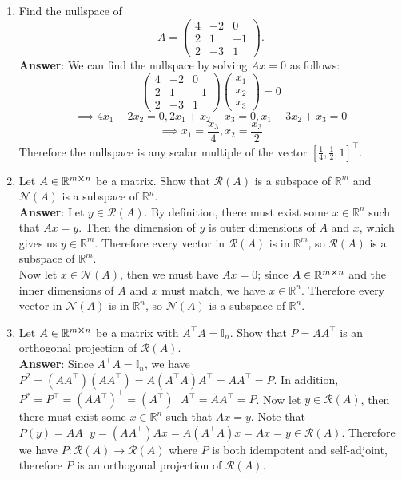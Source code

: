 \documentclass{article}
\begin{document}
\begin{enumerate}
    \item Find the nullspace of \[A=\begin{pmatrix}
                  4 & -2 & 0  \\
                  2 & 1  & -1 \\
                  2 & -3 & 1
              \end{pmatrix}.\]
          \textbf{Answer}: We can find the nullspace by solving $Ax=0$ as follows: \[\begin{pmatrix}
                  4 & -2 & 0  \\
                  2 & 1  & -1 \\
                  2 & -3 & 1
              \end{pmatrix}\begin{pmatrix}
                  x_1 \\x_2\\x_3
              \end{pmatrix}=0\]
          \[\implies 4x_1-2x_2=0, 2x_1+x_2-x_3=0, x_1-3x_2+x_3=0\]
          \[\implies x_1=\frac{x_3}{4}, x_2=\frac{x_3}{2}\]
          Therefore the nullspace is any scalar multiple of the vector $[\frac{1}{4},\frac{1}{2},1]^\top$.
    \item Let $A\in\mathbb{R}^{m\cross n}$ be a matrix. Show that $\mathcal{R}(A)$ is a subspace of $\mathbb{R}^m$ and $\mathcal{N}(A)$ is a subspace of $\mathbb{R}^n$.\\
          \textbf{Answer}: Let $y\in\mathcal{R}(A)$. By definition, there must exist some $x\in\mathbb{R}^n$ such that $Ax=y$. Then the dimension of $y$ is outer dimensions of $A$ and $x$, which gives us $y\in\mathbb{R}^m$. Therefore every vector in $\mathcal{R}(A)$ is in $\mathbb{R}^m$, so $\mathcal{R}(A)$ is a subspace of $\mathbb{R}^m$.
          \\Now let $x\in\mathcal{N}(A)$, then we must have $Ax=0$; since $A\in\mathbb{R}^{m\cross n}$ and the inner dimensions of $A$ and $x$ must match, we have $x\in\mathbb{R}^n$. Therefore every vector in $\mathcal{N}(A)$ is in $\mathbb{R}^n$, so $\mathcal{N}(A)$ is a subspace of $\mathbb{R}^n$.
    \item Let $A\in\mathbb{R}^{m\cross n}$ be a matrix with $A^\top A=\mathbb{I}_n$. Show that $P=AA^\top$ is an orthogonal projection of $\mathcal{R}(A)$.\\
          \textbf{Answer}: Since $A^\top A=\mathbb{I}_n$, we have $P^2=(AA^\top)(AA^\top)=A(A^\top A)A^\top=AA^\top=P$. In addition, $P^*=P^\top=(AA^\top)^\top=(A^\top)^\top A^\top=AA^\top=P$. Now let $y\in\mathcal{R}(A)$, then there must exist some $x\in\mathbb{R}^n$ such that $Ax=y$. Note that $P(y)=AA^\top y=(AA^\top) Ax=A(A^\top A)x=Ax=y\in\mathcal{R}(A)$. Therefore we have $P:\mathcal{R}(A)\rightarrow\mathcal{R}(A)$ where $P$ is both idempotent and self-adjoint, therefore $P$ is an orthogonal projection of $\mathcal{R}(A)$.

\end{enumerate}
\end{document}
